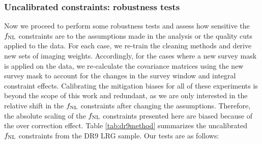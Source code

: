 \subsubsection{Uncalibrated constraints: robustness tests}
Now we proceed to perform some robustness tests and assess how sensitive the $f_{\rm NL}$ constraints are to the assumptions made in the analysis or the quality cuts applied to the data. For each case, we re-train the cleaning methods and derive new sets of imaging weights. Accordingly, for the cases where a new survey mask is applied on the data, we re-calculate the covariance matrices using the new survey mask to account for the changes in the survey window and integral constraint effects. Calibrating the mitigation biases for all of these experiments is beyond the scope of this work and redundant, as we are only interested in the relative shift in the $f_{\rm NL}$ constraints after changing the assumptions. Therefore, the absolute scaling of the $f_{\rm NL}$ constraints presented here are biased because of the over correction effect. Table \ref{tab:dr9method} summarizes the uncalibrated $f_{\rm NL}$ constraints from the DR9 LRG sample. Our tests are as follows:


